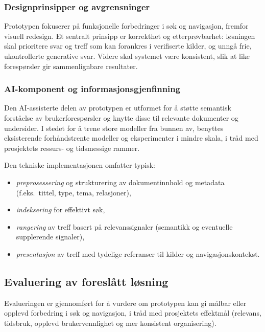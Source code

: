 \subsubsection{Designprinsipper og avgrensninger}
\label{sec:prinsipper}

Prototypen fokuserer på funksjonelle forbedringer i søk og navigasjon, fremfor visuell redesign. Et sentralt prinsipp er korrekthet og etterprøvbarhet: løsningen skal prioritere svar og treff som kan forankres i verifiserte kilder, og unngå frie, ukontrollerte generative svar. Videre skal systemet være konsistent, slik at like forespørsler gir sammenlignbare resultater. \cite{ProjectPlan}

\subsubsection{AI-komponent og informasjonsgjenfinning}
\label{sec:ai}

Den AI-assisterte delen av prototypen er utformet for å støtte semantisk forståelse av brukerforespørsler og knytte disse til relevante dokumenter og undersider. I stedet for å trene store modeller fra bunnen av, benyttes eksisterende forhåndstrente modeller og eksperimenter i mindre skala, i tråd med prosjektets ressurs- og tidsmessige rammer. \cite{ProjectPlan}

Den tekniske implementasjonen omfatter typisk:
\begin{itemize}
    \item \textit{preprosessering} og strukturering av dokumentinnhold og metadata (f.eks.\ tittel, type, tema, relasjoner),
    \item \textit{indeksering} for effektivt søk,
    \item \textit{rangering} av treff basert på relevanssignaler (semantikk og eventuelle supplerende signaler),
    \item \textit{presentasjon} av treff med tydelige referanser til kilder og navigasjonskontekst.
\end{itemize}

\subsection{Evaluering av foreslått løsning}
\label{sec:evaluering}

Evalueringen er gjennomført for å vurdere om prototypen kan gi målbar eller opplevd forbedring i søk og navigasjon, i tråd med prosjektets effektmål (relevans, tidsbruk, opplevd brukervennlighet og mer konsistent organisering). \cite{ProjectPlan}

